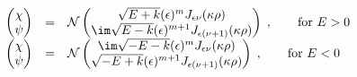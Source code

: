 \begin{equation}
\begin{array}{lcl}
\label{G45}\begin{pmatrix}\chi\\\psi\end{pmatrix} & = & \mathcal{N}
\begin{pmatrix}\sqrt{E+k}(\epsilon)^mJ_{\epsilon\nu}(\kappa\rho)\\
\im\sqrt{E-k}(\epsilon)^{m+1}J_{\epsilon(\nu+1)}(\kappa\rho)
\end{pmatrix}\;, \qquad \text{for } E > 0\\
\begin{pmatrix}\chi\\\psi\end{pmatrix} & = & \mathcal{N}
\begin{pmatrix}\im \sqrt{-E-k}(\epsilon)^mJ_{\epsilon\nu}(\kappa\rho)\\
\sqrt{-E+k}(\epsilon)^{m+1}J_{\epsilon(\nu+1)}(\kappa\rho) \end{pmatrix}
\;, \qquad
\text{for } E<0
\end{array}
\end{equation}

